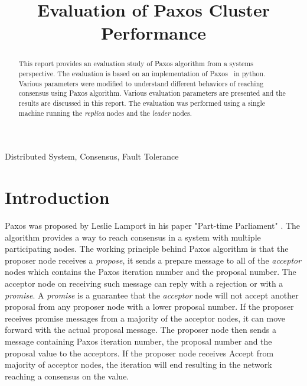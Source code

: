\documentclass[conference, onecolumn]{IEEEtran}
\begin{document}
\title{Evaluation of Paxos Cluster Performance
}

\author{
}

\maketitle

\begin{abstract}
This report provides an evaluation study of Paxos algorithm from a systems perspective. 
The evaluation is based on an implementation of Paxos~\cite{b3} in python.
Various parameters were modified to understand different behaviors of reaching consensus using Paxos algorithm. 
Various evaluation parameters are presented and the results are discussed in this report. 
The evaluation was performed using a single machine running the \textit{replica} nodes and the \textit{leader} nodes. 
\end{abstract}

\begin{IEEEkeywords}
Distributed System, Consensus, Fault Tolerance
\end{IEEEkeywords}

\section{Introduction}
Paxos was proposed by Leslie Lamport in his paper "Part-time Parliament" \cite{b1}. 
The algorithm provides a way to reach consensus in a system with multiple participating nodes. 
The working principle behind Paxos algorithm is that the proposer node receives a \textit{propose}, it sends a prepare message to all of the \textit{acceptor} nodes which contains the Paxos iteration number and the proposal number. 
The acceptor node on receiving such message can reply with a rejection or with a \textit{promise}. 
A \textit{promise} is a guarantee that the \textit{acceptor} node will not accept another proposal from any proposer node with a lower proposal number. 
If the proposer receives promise messages from a majority of the acceptor nodes, it can move forward with the actual proposal message. 
The proposer node then sends a message containing Paxos iteration number, the proposal number and the proposal value to the acceptors. 
If the proposer node receives Accept from majority of acceptor nodes, the iteration will end resulting in the network reaching a consensus on the value. 
\end{document}
